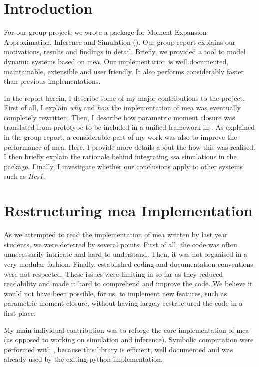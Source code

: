 \newpage{}

\section{Introduction}

For our group project, we wrote a \py{} package for Moment Expansion Approximation, Inference and Simulation (\means).
Our group report explains our motivations, results and findings in detail.
Briefly, we provided a tool to model dynamic systems based on \acrlong{mea}\cite{ale_general_2013}.
Our implementation is well documented, maintainable, extensible and user friendly.
It also performs considerably faster than previous implementations.

In the report herein, I describe some of my major contributions to the project.
First of all, I explain \emph{why} and \emph{how} the implementation of \acrlong{mea} was eventually completely rewritten.
Then, I describe how parametric moment closure was translated from \mat{} prototype to be included in a unified framework in \means.
As explained in the group report, a considerable part of my work was also to improve the performance of \gls{mea}.
Here, I provide more details about the how this was realised.  
I then briefly explain the rationale behind integrating \acrlong{ssa} simulations in the package.
Finally, I investigate whether our conclusions apply to other systems such as \emph{Hes1}.

\section{Restructuring \acrlong{mea} Implementation}
As we attempted to read the \py{} implementation of \acrshort{mea} written by last year students\cite{babtie_moment_2013},
we were deterred by several points.
First of all, the code was often unnecessarily intricate and hard to understand.
Then, it was not organised in a very modular fashion.
Finally, established \py{} coding and documentation conventions\cite{_pep_????} were not respected.
These issues were limiting in so far as they reduced readability and made it hard to comprehend and improve the code.
We believe it would not have been possible, for us, to implement new features, such as parametric moment closure,
without having largely restructured the code in a first place.

My main individual contribution was to reforge the core implementation of \acrshort{mea} (as opposed to working on simulation and inference).
Symbolic computation were performed with \sympy{}\cite{sympy_development_team_sympy:_2014},
because this library is efficient, well documented and was already used by the exiting python implementation\cite{babtie_moment_2013}.
 
